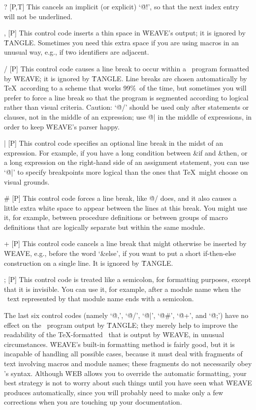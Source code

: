 \@? [P,T] This cancels an implicit (or explicit) `\.{@!}', so that the next
index entry will not be underlined.

\@, [P] This control code inserts a thin space in \.{WEAVE}'s output; it is
ignored by \.{TANGLE}. Sometimes you need this extra space if you are using
macros in an unusual way, e.g., if two identifiers are adjacent.

\@/ [P] This control code causes a line break to occur within a \PASCAL\
program formatted by \.{WEAVE}; it is ignored by \.{TANGLE}. Line breaks
are chosen automatically by \TeX\ according to a scheme that works 99\%\
of the time, but sometimes you will prefer to force a line break so that
the program is segmented according to logical rather than visual criteria.
Caution: `\.{@/}' should be used only after statements or clauses, not in
the middle of an expression; use \.{@|} in the middle of expressions, in
order to keep \.{WEAVE}'s parser happy.

\@| [P] This control code specifies an optional line break in the midst of
an expression. For example, if you have a long condition between \&{if} and
\&{then}, or a long expression on the right-hand side of an assignment
statement, you can use `\.{@|}' to specify breakpoints more logical than
the ones that \TeX\ might choose on visual grounds.

\@\# [P] This control code forces a line break, like \.{@/} does,
and it also causes a little extra white space to appear between the lines at
this break. You might use it, for example, between procedure definitions or
between groups of macro definitions that are logically separate but within
the same module.

\@+ [P] This control code cancels a line break that might otherwise be
inserted by \.{WEAVE}, e.g., before the word `\&{else}', if you want to
put a short if-then-else construction on a single line. It is ignored by
\.{TANGLE}.

\@; [P] This control code is treated like a semicolon, for formatting
purposes, except that it is invisible. You can use it, for example, after
a module name when the \PASCAL\ text represented by that module name ends
with a semicolon.

\yskip\noindent
The last six control codes (namely `\.{@,}', `\.{@/}', `\.{@|}',
`\.{@\#}', `\.{@+}', and `\.{@;}') have no effect on the \PASCAL\
program output by \.{TANGLE}; they merely help to improve the readability
of the \TeX-formatted \PASCAL\ that is output by \.{WEAVE}, in unusual
circumstances. \.{WEAVE}'s built-in formatting method is fairly good, but
it is incapable of handling all possible cases, because it must deal with
fragments of text involving macros and module names; these fragments do
not necessarily obey \PASCAL's syntax. Although \.{WEB} allows you to
override the automatic formatting, your best strategy is not to worry
about such things until you have seen what \.{WEAVE} produces automatically,
since you will probably need to make only a few corrections when you are
touching up your documentation.


